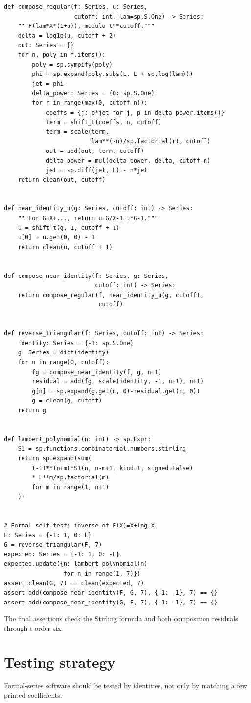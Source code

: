\documentclass[11pt,openany]{book}
\theoremstyle{definition}
\theoremstyle{plain}
\theoremstyle{remark}
\begin{document}
\begin{lstlisting}[style=pythonstyle]
def compose_regular(f: Series, u: Series,
                    cutoff: int, lam=sp.S.One) -> Series:
    """F(lam*X*(1+u)), modulo t**cutoff."""
    delta = log1p(u, cutoff + 2)
    out: Series = {}
    for n, poly in f.items():
        poly = sp.sympify(poly)
        phi = sp.expand(poly.subs(L, L + sp.log(lam)))
        jet = phi
        delta_power: Series = {0: sp.S.One}
        for r in range(max(0, cutoff-n)):
            coeffs = {j: p*jet for j, p in delta_power.items()}
            term = shift_t(coeffs, n, cutoff)
            term = scale(term,
                         lam**(-n)/sp.factorial(r), cutoff)
            out = add(out, term, cutoff)
            delta_power = mul(delta_power, delta, cutoff-n)
            jet = sp.diff(jet, L) - n*jet
    return clean(out, cutoff)


def near_identity_u(g: Series, cutoff: int) -> Series:
    """For G=X+..., return u=G/X-1=t*G-1."""
    u = shift_t(g, 1, cutoff + 1)
    u[0] = u.get(0, 0) - 1
    return clean(u, cutoff + 1)


def compose_near_identity(f: Series, g: Series,
                          cutoff: int) -> Series:
    return compose_regular(f, near_identity_u(g, cutoff),
                           cutoff)


def reverse_triangular(f: Series, cutoff: int) -> Series:
    identity: Series = {-1: sp.S.One}
    g: Series = dict(identity)
    for n in range(0, cutoff):
        fg = compose_near_identity(f, g, n+1)
        residual = add(fg, scale(identity, -1, n+1), n+1)
        g[n] = sp.expand(g.get(n, 0)-residual.get(n, 0))
        g = clean(g, cutoff)
    return g


def lambert_polynomial(n: int) -> sp.Expr:
    S1 = sp.functions.combinatorial.numbers.stirling
    return sp.expand(sum(
        (-1)**(n+m)*S1(n, n-m+1, kind=1, signed=False)
        * L**m/sp.factorial(m)
        for m in range(1, n+1)
    ))


# Formal self-test: inverse of F(X)=X+log X.
F: Series = {-1: 1, 0: L}
G = reverse_triangular(F, 7)
expected: Series = {-1: 1, 0: -L}
expected.update({n: lambert_polynomial(n)
                 for n in range(1, 7)})
assert clean(G, 7) == clean(expected, 7)
assert add(compose_near_identity(F, G, 7), {-1: -1}, 7) == {}
assert add(compose_near_identity(G, F, 7), {-1: -1}, 7) == {}
\end{lstlisting}
The final assertions check the Stirling formula and both composition residuals
through t-order six.

\section{Testing strategy}
Formal-series software should be tested by identities, not only by matching a
few printed coefficients.
\end{document}
